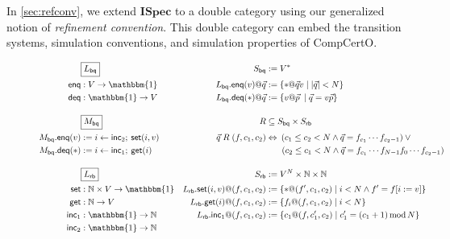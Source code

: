 \documentclass[sigplan,10pt,authordraft]{acmart}
\newcommand{\ISpec}{\mathbf{ISpec}}
\begin{document}
In \autoref{sec:refconv},
we extend $\ISpec$ to a double category
using our generalized notion of \emph{refinement convention}.
This double category can embed
the transition systems,
simulation conventions, and
simulation properties of CompCertO.



\begin{figure*} %
  \begin{minipage}{.9\textwidth}
    \begin{align*}
      & \fbox{$L_\kw{bq}$} &
        S_\kw{bq} &:= V^* \\
      \kw{enq} &: V \rightarrow \mathbbm{1} &
        L_\kw{bq}.\kw{enq}(v)@\vec{q} &:= \{ * @ \vec{q} v \mid |\vec{q}| < N \} \\
      \kw{deq} &: \mathbbm{1} \rightarrow V &
        L_\kw{bq}.\kw{deq}(*)@\vec{q} &:= \{ v @ \vec{p} \: \mid \vec{q} = v \vec{p} \}
      \\[1em]
      & \fbox{$M_\kw{bq}$} &
        R &\subseteq S_\kw{bq} \times S_\kw{rb} \\
      M_\kw{bq}.\kw{enq}(v) &:= i \leftarrow \kw{inc}_2 ; \: \kw{set}(i, v) &
        \vec{q} \mathrel{R} (f, c_1, c_2) &\Leftrightarrow
        \: (c_1 \le c_2 < N \wedge
            \vec{q} = f_{c_1} \cdots f_{c_2-1}) \vee {}
      \\
      M_\kw{bq}.\kw{deq}(*) &:= i \leftarrow \kw{inc}_1 ; \: \kw{get}(i) &
        & \qquad \! (c_2 \le c_1 < N \wedge
            \vec{q} = f_{c_1} \cdots f_{N-1} f_0 \cdots f_{c_2 - 1})
      \\[1em]
      & \fbox{$L_\kw{rb}$} &
        S_\kw{rb} &:= V^N \times \mathbb{N} \times \mathbb{N}
      \\
      \kw{set} &: \mathbb{N} \times V \rightarrow \mathbbm{1} &
        L_\kw{rb}.\kw{set}(i, v)@(f, c_1, c_2) &:=
        \{ *@(f', c_1, c_2) \mid i < N \wedge f' = f[i := v] \}
      \\
      \kw{get} &: \mathbb{N} \rightarrow V &
        L_\kw{rb}.\kw{get}(i)@(f, c_1, c_2) &:=
        \{ f_i@(f, c_1, c_2) \mid i < N \}
      \\
      \kw{inc}_1 &: \mathbbm{1} \rightarrow \mathbb{N} &
        L_\kw{rb}.\kw{inc}_1@(f, c_1, c_2) &:=
        \{ c_1@(f, c_1', c_2) \mid
           c_1' = (c_1 + 1) \mathop{\mathrm{mod}} N \}
      \\
      \kw{inc}_2 &: \mathbbm{1} \rightarrow \mathbb{N} &

\end{align*}
\end{minipage}
\end{figure*}
\end{document}
